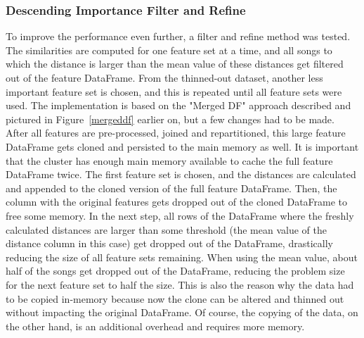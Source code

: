 \subsubsection{Descending Importance Filter and Refine}\label{farfs}

To improve the performance even further, a filter and refine method was tested. The similarities are computed for one feature set at a time, and all songs to which the distance is larger than the mean value of these distances get filtered out of the feature DataFrame. From the thinned-out dataset, another less important feature set is chosen, and this is repeated until all feature sets were used. 
The implementation is based on the "Merged DF" approach described and pictured in Figure~\ref{mergeddf} earlier on, but a few changes had to be made. After all features are pre-processed, joined and repartitioned, this large feature DataFrame gets cloned and persisted to the main memory as well. It is important that the cluster has enough main memory available to cache the full feature DataFrame twice. 
\noindent The first feature set is chosen, and the distances are calculated and appended to the cloned version of the full feature DataFrame. Then, the column with the original features gets dropped out of the cloned DataFrame to free some memory. In the next step, all rows of the DataFrame where the freshly calculated distances are larger than some threshold (the mean value of the distance column in this case) get dropped out of the DataFrame, drastically reducing the size of all feature sets remaining.
When using the mean value, about half of the songs get dropped out of the DataFrame, reducing the problem size for the next feature set to half the size. This is also the reason why the data had to be copied in-memory because now the clone can be altered and thinned out without impacting the original DataFrame. Of course, the copying of the data, on the other hand, is an additional overhead and requires more memory. 

